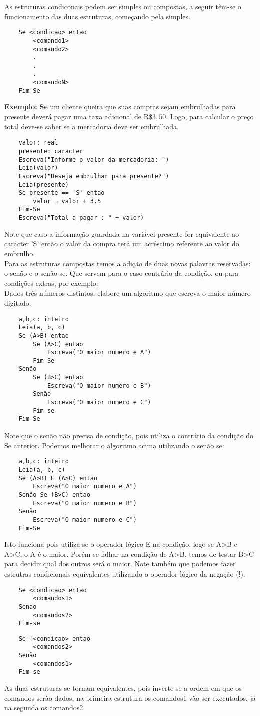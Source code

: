 As estruturas condiconais podem ser simples ou compostas, a seguir têm-se o funcionamento das duas estruturas, começando pela simples.
\begin{lstlisting}
    Se <condicao> entao
        <comando1>
        <comando2>
        .
        .
        .
        <comandoN>
    Fim-Se
\end{lstlisting}
\textbf{Exemplo:} \textbf{Se} um cliente queira que suas compras sejam embrulhadas para presente deverá pagar uma taxa adicional de R\$$3,50$. Logo, para calcular o preço total deve-se saber se a mercadoria deve ser embrulhada.
\begin{lstlisting}
    valor: real
    presente: caracter
    Escreva("Informe o valor da mercadoria: ")
    Leia(valor)
    Escreva("Deseja embrulhar para presente?")
    Leia(presente)
    Se presente == 'S' entao
        valor = valor + 3.5
    Fim-Se
    Escreva("Total a pagar : " + valor)
\end{lstlisting}
Note que caso a informação guardada na variável presente for equivalente ao caracter 'S' então o valor da compra terá um acréscimo referente ao valor do embrulho. \\
Para as estruturas compostas temos a adição de duas novas palavras reservadas: o senão e o senão-se. Que servem para o caso contrário da condição, ou para condições extras, por exemplo: \\
Dados três números distintos, elabore um algoritmo que escreva o maior número digitado.
\begin{lstlisting}
    a,b,c: inteiro
    Leia(a, b, c)
    Se (A>B) entao
        Se (A>C) entao
            Escreva("O maior numero e A")
        Fim-Se
    Senão
        Se (B>C) entao
            Escreva("O maior numero e B")
        Senão
            Escreva("O maior numero e C")
        Fim-se
    Fim-Se
\end{lstlisting}
Note que o senão não precisa de condição, pois utiliza o contrário da condição do Se anterior. Podemos melhorar o algoritmo acima utilizando o senão se:
\begin{lstlisting}
    a,b,c: inteiro
    Leia(a, b, c)
    Se (A>B) E (A>C) entao
        Escreva("O maior numero e A")
    Senão Se (B>C) entao
        Escreva("O maior numero e B")
    Senão
        Escreva("O maior numero e C")
    Fim-Se
\end{lstlisting}
Isto funciona pois utiliza-se o operador lógico E na condição, logo se A>B e A>C, o A é o maior. Porém se falhar na condição de A>B, temos de testar B>C para decidir qual dos outros será o maior. Note também que podemos fazer estrutras condicionais equivalentes utilizando o operador lógico da negação (!).
\begin{lstlisting}
    Se <condicao> entao
        <comandos1>
    Senao
        <comandos2>
    Fim-se
\end{lstlisting}
\begin{lstlisting}
    Se !<condicao> entao
        <comandos2>
    Senão
        <comandos1>
    Fim-se
\end{lstlisting}
As duas estruturas se tornam equivalentes, pois inverte-se a ordem em que os comandos serão dados, na primeira estrutura os comandos1 vão ser executados, já na segunda os comandos2.